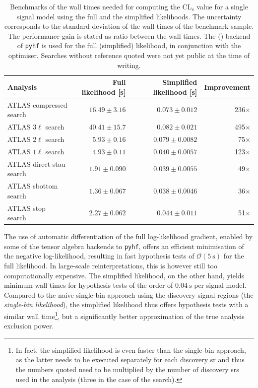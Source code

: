 \begin{table}
	\begin{center}
	\small
			\begin{tabular} {l r r r}
				\toprule
				Analysis & Full likelihood [s] & Simplified likelihood [s] & Improvement \\
				\midrule
				ATLAS compressed search~\cite{SUSY-2018-16} & $16.49\pm 3.16$ & $0.073 \pm 0.012$ & 236$\times$ \\
				ATLAS $3\ell$ search & $40.41 \pm 15.7$ & $0.082 \pm 0.021$ & 495$\times$\\
				ATLAS $2\ell$ search~\cite{SUSY-2018-32} & $5.93 \pm 0.16$ & $0.079 \pm 0.0082$ & 75$\times$\\
				ATLAS $1\ell$ search~\cite{SUSY-2019-08} & $4.93 \pm 0.11$ & $0.040 \pm 0.0057$ & 123$\times$ \\
				ATLAS direct stau search~\cite{SUSY-2018-04} & $1.91 \pm 0.090$ & $0.039 \pm 0.0055$ & 49$\times$\\
				ATLAS sbottom search~\cite{SUSY-2018-31} & $1.36 \pm 0.067$ & $0.038 \pm 0.0046$ & 36$\times$ \\
				ATLAS stop search~\cite{SUSY-2018-07} & $2.27 \pm 0.062$ & $0.044 \pm 0.011$ & 51$\times$\\
				\bottomrule
			\end{tabular}
		\caption{Benchmarks of the wall times needed for computing the CL$_s$ value for a single signal model using the full and the simplified likelihoods. 
		The uncertainty corresponds to the standard deviation of the wall times of the benchmark sample.
		The performance gain is stated as ratio between the wall times. The  () backend of \texttt{pyhf} is used for the full (simplified) likelihood, in conjunction with the  optimiser. Searches without reference quoted were not yet public at the time of writing.}
		\label{tab:simplified_performance}
	\end{center}
\end{table}

The use of automatic differentiation of the full log-likelihood gradient, enabled by some of the tensor algebra backends to \texttt{pyhf}, offers an efficient minimisation of the negative log-likelihood, resulting in fast hypothesis tests of $\mathcal{O}(\SI{5}{\second})$ for the full likelihood.
In large-scale reinterpretations, this is however still too computationally expensive.
The simplified likelihood, on the other hand, yields minimum wall times for hypothesis tests of the order of $\SI{0.04}{\second}$ per signal model.
Compared to the naive single-bin approach using the discovery signal regions (the \textit{single-bin likelihood}), the simplified likelihood thus offers hypothesis tests with a similar wall time\footnote{In fact, the simplified likelihood is even faster than the single-bin approach, as the latter needs to be executed separately for each discovery \gls{sr} and thus the numbers quoted need to be multiplied by the number of discovery \glspl{sr} used in the analysis (three in the case of the \onelepton search).}, but a significantly better approximation of the true analysis exclusion power.

